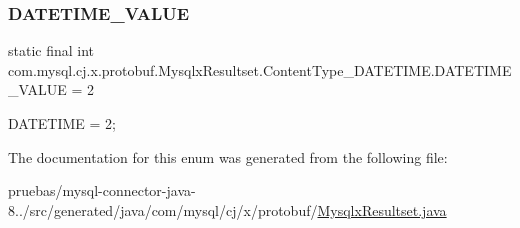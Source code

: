 \subsubsection{\texorpdfstring{D\+A\+T\+E\+T\+I\+M\+E\+\_\+\+V\+A\+L\+UE}{DATETIME\_VALUE}}
{\footnotesize\ttfamily  static  final int com.\+mysql.\+cj.\+x.\+protobuf.\+Mysqlx\+Resultset.\+Content\+Type\+\_\+\+D\+A\+T\+E\+T\+I\+M\+E.\+D\+A\+T\+E\+T\+I\+M\+E\+\_\+\+V\+A\+L\+UE = 2\hspace{0.3cm}{\ttfamily [static]}}

{\ttfamily D\+A\+T\+E\+T\+I\+ME = 2;} 

The documentation for this enum was generated from the following file\+:\begin{DoxyCompactItemize}
\item 
pruebas/mysql-\/connector-\/java-\/8../src/generated/java/com/mysql/cj/x/protobuf/\mbox{\hyperlink{_mysqlx_resultset_8java}{Mysqlx\+Resultset.\+java}}\end{DoxyCompactItemize}
